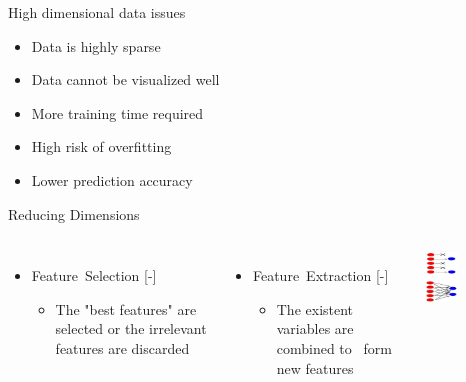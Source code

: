 \documentclass[aspectratio=169,14pt,usenames,dvipsnames]{beamer}
\begin{document}
\begin{frame}{High dimensional data issues}
\begin{itemize}
\item Data is highly sparse
\item Data cannot be visualized well
\item More training time required
\item High risk of overfitting
\item Lower prediction accuracy
\end{itemize}
\end{frame}

\begin{frame}{Reducing Dimensions}
\begin{columns}
\begin{itemize}
\color{Red}
\item Feature Selection
[-]
\begin{itemize}
\item The "best features" are selected or the irrelevant features are discarded
\end{itemize}
\end{itemize}
\begin{itemize}
\color{Red}
\item Feature Extraction
[-]
\begin{itemize}
\item The existent variables are combined to  form new features
\end{itemize}
\end{itemize}
\includegraphics[width=0.4\textwidth, height=0.7\textheight]{Images/AIML_FD_IMG2.jpg}
\end{columns}
\end{frame}
\end{document}
